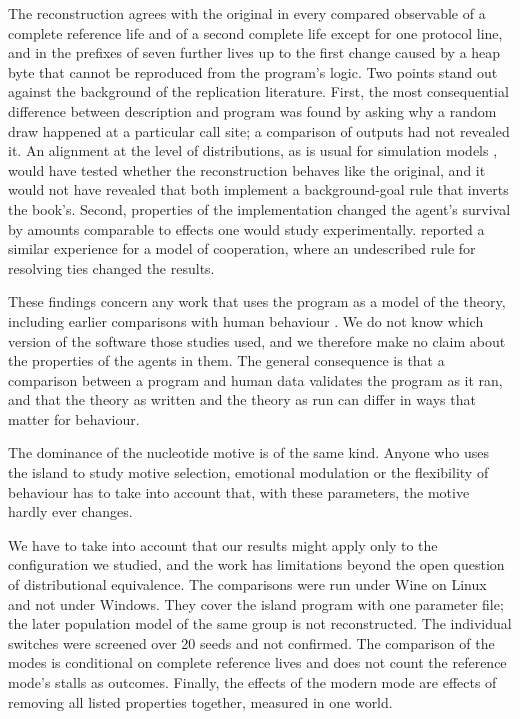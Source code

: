 \documentclass[preprint,12pt,authoryear]{elsarticle}
\begin{document}
The reconstruction agrees with the original in every compared observable of a complete reference life and of a second complete life except for one protocol line, and in the prefixes of seven further lives up to the first change caused by a heap byte that cannot be reproduced from the program's logic. Two points stand out against the background of the replication literature. First, the most consequential difference between description and program was found by asking why a random draw happened at a particular call site; a comparison of outputs had not revealed it. An alignment at the level of distributions, as is usual for simulation models \citep{axtell1996aligning,wilensky2007making}, would have tested whether the reconstruction behaves like the original, and it would not have revealed that both implement a background-goal rule that inverts the book's. Second, properties of the implementation changed the agent's survival by amounts comparable to effects one would study experimentally. \citet{edmonds2003replication} reported a similar experience for a model of cooperation, where an undescribed rule for resolving ties changed the results.

These findings concern any work that uses the program as a model of the theory, including earlier comparisons with human behaviour \citep{doerner2004emotions}. We do not know which version of the software those studies used, and we therefore make no claim about the properties of the agents in them. The general consequence is that a comparison between a program and human data validates the program as it ran, and that the theory as written and the theory as run can differ in ways that matter for behaviour.

The dominance of the nucleotide motive is of the same kind. Anyone who uses the island to study motive selection, emotional modulation or the flexibility of behaviour has to take into account that, with these parameters, the motive hardly ever changes.

We have to take into account that our results might apply only to the configuration we studied, and the work has limitations beyond the open question of distributional equivalence. The comparisons were run under Wine on Linux and not under Windows. They cover the island program with one parameter file; the later population model of the same group is not reconstructed. The individual switches were screened over 20 seeds and not confirmed. The comparison of the modes is conditional on complete reference lives and does not count the reference mode's stalls as outcomes. Finally, the effects of the modern mode are effects of removing all listed properties together, measured in one world.
\end{document}
